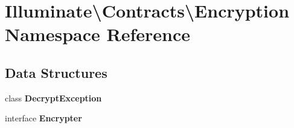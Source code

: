 \section{Illuminate\textbackslash{}Contracts\textbackslash{}Encryption Namespace Reference}
\label{namespace_illuminate_1_1_contracts_1_1_encryption}
\subsection*{Data Structures}
\begin{DoxyCompactItemize}
\item 
class {\bf Decrypt\+Exception}
\item 
interface {\bf Encrypter}
\end{DoxyCompactItemize}
